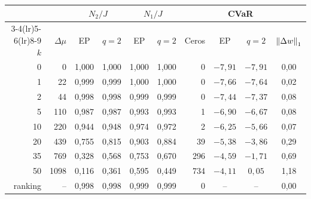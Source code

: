 \begin{tabular}{rrccccrccc}
\toprule
 & & \multicolumn{2}{c}{$N_2/J$} & \multicolumn{2}{c}{$N_1/J$} & & \multicolumn{2}{c}{CVaR} & \\
\cmidrule(lr){3-4}\cmidrule(lr){5-6}\cmidrule(lr){8-9}
$k$ & $\Delta\mu$ & EP & $q=2$ & EP & $q=2$ & Ceros & EP & $q=2$ & $\left\lVert \Delta w \right\rVert_1$ \\
\midrule
0 & 0 & 1{,}000 & 1{,}000 & 1{,}000 & 1{,}000 & 0 & $-7{,}91$ & $-7{,}91$ & 0{,}00 \\
1 & 22 & 0{,}999 & 0{,}999 & 1{,}000 & 1{,}000 & 0 & $-7{,}66$ & $-7{,}64$ & 0{,}02 \\
2 & 44 & 0{,}998 & 0{,}998 & 0{,}999 & 0{,}999 & 0 & $-7{,}44$ & $-7{,}37$ & 0{,}08 \\
5 & 110 & 0{,}987 & 0{,}987 & 0{,}993 & 0{,}993 & 1 & $-6{,}90$ & $-6{,}67$ & 0{,}08 \\
10 & 220 & 0{,}944 & 0{,}948 & 0{,}974 & 0{,}972 & 2 & $-6{,}25$ & $-5{,}66$ & 0{,}07 \\
20 & 439 & 0{,}755 & 0{,}815 & 0{,}903 & 0{,}884 & 39 & $-5{,}38$ & $-3{,}86$ & 0{,}29 \\
35 & 769 & 0{,}328 & 0{,}568 & 0{,}753 & 0{,}670 & 296 & $-4{,}59$ & $-1{,}71$ & 0{,}69 \\
50 & 1098 & 0{,}116 & 0{,}361 & 0{,}595 & 0{,}449 & 734 & $-4{,}11$ & $0{,}05$ & 1{,}18 \\
\midrule
ranking & -- & 0{,}998 & 0{,}998 & 0{,}999 & 0{,}999 & 0 & -- & -- & 0{,}00 \\
\bottomrule
\end{tabular}
